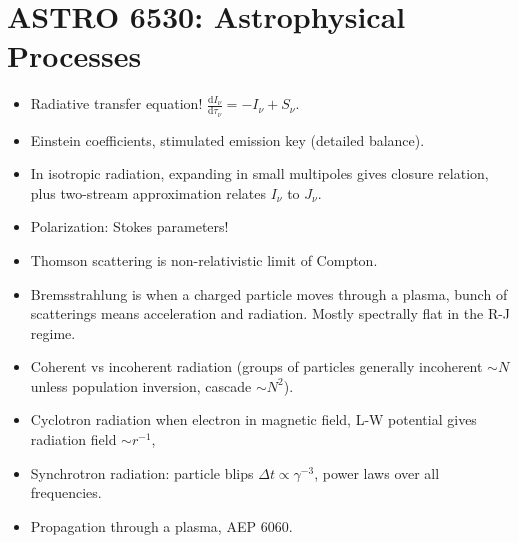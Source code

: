 \documentclass[11pt,
        usenames, %
        dvipsnames %
    ]{article}
\newcommand*{\rd}[2]{\frac{\mathrm{d}#1}{\mathrm{d}#2}}
\begin{document}
\section{ASTRO 6530: Astrophysical Processes}

\begin{itemize}
    \item Radiative transfer equation! $\rd{I_\nu}{\tau_\nu} = -I_\nu + S_\nu$.

    \item Einstein coefficients, stimulated emission key (detailed balance).

    \item In isotropic radiation, expanding in small multipoles gives closure
        relation, plus two-stream approximation relates $I_\nu$ to $J_\nu$.

    \item Polarization: Stokes parameters!

    \item Thomson scattering is non-relativistic limit of Compton.

    \item Bremsstrahlung is when a charged particle moves through a plasma,
        bunch of scatterings means acceleration and radiation. Mostly spectrally
        flat in the R-J regime.

    \item Coherent vs incoherent radiation (groups of particles generally
        incoherent $\sim N$ unless population inversion, cascade $\sim N^2$).

    \item Cyclotron radiation when electron in magnetic field, L-W potential
        gives radiation field $\sim r^{-1}$,

    \item Synchrotron radiation: particle blips $\Delta t \propto \gamma^{-3}$,
        power laws over all frequencies.

    \item Propagation through a plasma, AEP 6060.
\end{itemize}
\end{document}
